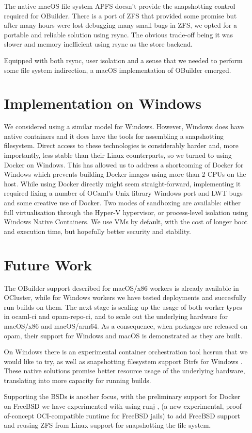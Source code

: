 \documentclass[manuscript,screen,review,sigplan]{acmart}
\begin{document}
The native macOS file system APFS doesn’t provide the snapshotting control required for OBuilder. There is a port of ZFS that provided some promise but after many hours were lost debugging many small bugs in ZFS, we opted for a portable and reliable solution using rsync. The obvious trade-off being it was slower and memory inefficient using rsync as the store backend.

Equipped with both rsync, user isolation and a sense that we needed to perform some file system indirection, a macOS implementation of OBuilder emerged.

\section{Implementation on Windows}

We considered using a similar model for Windows. However, Windows does have native containers and it does have the tools for assembling a snapshotting filesystem. Direct access to these technologies is considerably harder and, more importantly, less stable than their Linux counterparts, so we turned to using Docker on Windows. This has allowed us to address a shortcoming of Docker for Windows which prevents building Docker images using more than 2 CPUs on the host. While using Docker directly might seem straight-forward, implementing it required fixing a number of OCaml’s Unix library Windows port and LWT bugs and some creative use of Docker. Two modes of sandboxing are available: either full virtualisation through the Hyper-V hypervisor, or process-level isolation using Windows Native Containers. We use VMs by default, with the cost of longer boot and execution time, but hopefully better security and stability.

\section{Future Work}

The OBuilder support described for macOS/x86 workers is already available in OCluster, while for 
Windows workers we have tested deployments and succesfully run builds on them. The next stage 
is scaling up the usage of both worker types in ocaml-ci and opam-repo-ci, and to scale out the underlying hardware for macOS/x86 and macOS/arm64. As a consequence, when packages are released on opam, their support for Windows and macOS is demonstrated as they are built.

On Windows there is an experimental container orchestration tool hcsrun that we would like to try, as well as snapshotting filesystem support Btrfs for Windows \cite{BtrfsWindows16}. These native solutions promise better resource usage of the underlying hardware, translating into more capacity for running builds.

Supporting the BSDs is another focus, with the preliminary support for Docker on FreeBSD we have experimented with using runj \cite{runj21}, (a new experimental, proof-of-concept OCI-compatible runtime for FreeBSD jails) to add FreeBSD support and reusing ZFS from Linux support for snapshotting the file system. 



\end{document}
